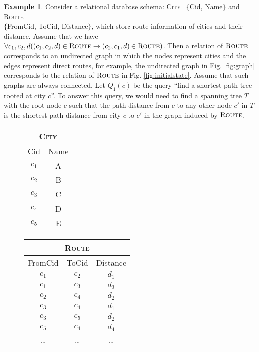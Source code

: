 \documentclass[preprint,11pt]{elsarticle}
\theoremstyle{definition}
\newtheorem{example}{Example}[section]
\theoremstyle{remark}
\begin{document}
\begin{example}\label{exa:DBASM-db}
Consider a relational database schema: \textsc{City}=$\{$Cid, Name$\}$ and 
\textsc{Route}= \\
$\{$FromCid, ToCid, Distance$\}$, which store route information of cities and their distance.
Assume that we have $\forall c_1, c_2,d ((c_1, c_2, d) \in \textsc{Route}\rightarrow (c_2, c_1, d) \in \textsc{Route})$. Then a relation of $\textsc{Route}$ corresponds to an undirected graph in which the nodes represent cities and the edges represent direct routes, for example, the undirected graph in Fig. \ref{fig:graph} corresponds to the relation of $\textsc{Route}$ in Fig. \ref{fig:initialstate}. Assume that such graphs are always connected. Let $Q_1(c)$ be the query ``find a shortest path tree rooted at city $c$''. To answer this query, we would need to find a spanning tree $T$ with the root node $c$ such that the path distance from $c$ to any other node $c'$ in $T$ is the shortest path distance from city $c$ to $c'$ in the graph induced by $\textsc{Route}$.
\begin{figure}[!ht]
\begin{minipage}{2.5cm}
\hspace*{1cm}
\end{minipage}
\begin{minipage}{2.5cm}
{\normalsize\begin{tabular}{|c|c|}\hline
 \multicolumn{2}{|c|}{\textsc{City}}\\
  \hline
  Cid & Name \\\hline
  $c_1$ & A \\
  $c_2$ & B \\
  $c_3$ & C \\
  $c_4$ & D \\
  $c_5$ & E \\
  \hline
\end{tabular}}
\end{minipage}
\begin{minipage}{3.6cm}
\vspace*{1cm}
{\centering
\begin{tabular}{|c|c|c|}
  \hline
   \multicolumn{3}{|c|}{\textsc{Route}}\\\hline
  FromCid & ToCid & Distance \\\hline
  $c_1$ & $c_2$ & $d_1$ \\
  $c_1$ & $c_3$ & $d_3$ \\
  $c_2$ & $c_4$ & $d_2$ \\
  $c_3$ & $c_4$ & $d_1$ \\
  $c_3$ & $c_5$ & $d_2$ \\
  $c_5$ & $c_4$ & $d_4$ \\
  \dots & \dots  & \dots\\
  \hline
\end{tabular}}
\medskip
\end{minipage}


\end{figure}
\end{example}
\end{document}
